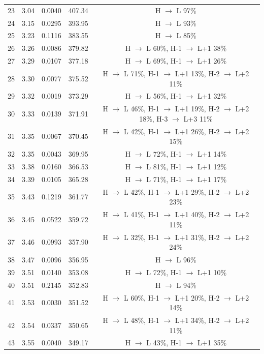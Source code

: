 \begin{table}[H]
{\begin{center}
\begin{tabular}{ccccc}
23 & 3.04 & 0.0040 & 407.34 & H $\rightarrow$ L 97\% \\
24 & 3.15 & 0.0295 & 393.95 & H $\rightarrow$ L 93\% \\
25 & 3.23 & 0.1116 & 383.55 & H $\rightarrow$ L 85\% \\
26 & 3.26 & 0.0086 & 379.82 & H $\rightarrow$ L 60\%, H-1 $\rightarrow$ L+1 38\% \\
27 & 3.29 & 0.0107 & 377.18 & H $\rightarrow$ L 69\%, H-1 $\rightarrow$ L+1 26\% \\
28 & 3.30 & 0.0077 & 375.52 & H $\rightarrow$ L 71\%, H-1 $\rightarrow$ L+1 13\%, H-2 $\rightarrow$ L+2 11\% \\
29 & 3.32 & 0.0019 & 373.29 & H $\rightarrow$ L 56\%, H-1 $\rightarrow$ L+1 32\% \\
30 & 3.33 & 0.0139 & 371.91 & H $\rightarrow$ L 46\%, H-1 $\rightarrow$ L+1 19\%, H-2 $\rightarrow$ L+2 18\%, H-3 $\rightarrow$ L+3 11\% \\
31 & 3.35 & 0.0067 & 370.45 & H $\rightarrow$ L 42\%, H-1 $\rightarrow$ L+1 26\%, H-2 $\rightarrow$ L+2 15\% \\
32 & 3.35 & 0.0043 & 369.95 & H $\rightarrow$ L 72\%, H-1 $\rightarrow$ L+1 14\% \\
33 & 3.38 & 0.0160 & 366.53 & H $\rightarrow$ L 81\%, H-1 $\rightarrow$ L+1 12\% \\
34 & 3.39 & 0.0105 & 365.28 & H $\rightarrow$ L 71\%, H-1 $\rightarrow$ L+1 17\% \\
35 & 3.43 & 0.1219 & 361.77 & H $\rightarrow$ L 42\%, H-1 $\rightarrow$ L+1 29\%, H-2 $\rightarrow$ L+2 23\% \\
36 & 3.45 & 0.0522 & 359.72 & H $\rightarrow$ L 41\%, H-1 $\rightarrow$ L+1 40\%, H-2 $\rightarrow$ L+2 11\% \\
37 & 3.46 & 0.0993 & 357.90 & H $\rightarrow$ L 32\%, H-1 $\rightarrow$ L+1 31\%, H-2 $\rightarrow$ L+2 24\% \\
38 & 3.47 & 0.0096 & 356.95 & H $\rightarrow$ L 96\% \\
39 & 3.51 & 0.0140 & 353.08 & H $\rightarrow$ L 72\%, H-1 $\rightarrow$ L+1 10\% \\
40 & 3.51 & 0.2145 & 352.83 & H $\rightarrow$ L 94\% \\
41 & 3.53 & 0.0030 & 351.52 & H $\rightarrow$ L 60\%, H-1 $\rightarrow$ L+1 20\%, H-2 $\rightarrow$ L+2 14\% \\
42 & 3.54 & 0.0337 & 350.65 & H $\rightarrow$ L 48\%, H-1 $\rightarrow$ L+1 34\%, H-2 $\rightarrow$ L+2 11\% \\
43 & 3.55 & 0.0040 & 349.17 & H $\rightarrow$ L 43\%, H-1 $\rightarrow$ L+1 35\% \\

\end{tabular}
\end{center}}
\end{table}

